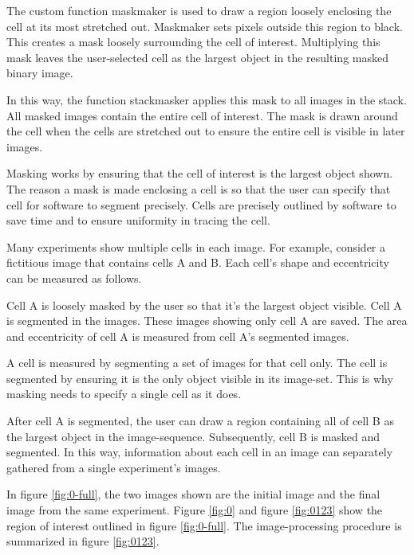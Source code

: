\documentclass[ twocolumn,notitlepage]{ revtex4-1}
\begin{document}
The custom function maskmaker is used to draw a region loosely enclosing the cell at its most stretched out. Maskmaker sets pixels outside this region to black. This creates a mask loosely surrounding the cell of interest. Multiplying this mask leaves the user-selected cell as the largest object in the resulting masked binary image.

In this way, the function stackmasker applies this mask to all images in the stack. All masked images contain the entire cell of interest. The mask is drawn around the cell when the cells are stretched out to ensure the entire cell is visible in later images.

Masking works by ensuring that the cell of interest is the largest object shown. The reason a mask is made enclosing a cell is so that the user can specify that cell for software to segment precisely. Cells are precisely outlined by software to save time and to ensure uniformity in tracing the cell.

Many experiments show multiple cells in each image. For example, consider a fictitious image that contains cells A and B. Each cell's shape and eccentricity can be measured as follows.

Cell A is loosely masked by the user so that it's the largest object visible. Cell A is segmented in the images. These images showing only cell A are saved. The area and eccentricity of cell A is measured from cell A's segmented images.

A cell is measured by segmenting a set of images for that cell only. The cell is segmented by ensuring it is the only object visible in its image-set. This is why masking needs to specify a single cell as it does.

After cell A is segmented, the user can draw a region containing all of cell B as the largest object in the image-sequence. Subsequently, cell B is masked and segmented. In this way, information about each cell in an image can separately gathered from a single experiment's images.

In figure \ref{fig:0-full}, the two images shown are the initial image and the final image from the same experiment. Figure \ref{fig:0} and figure \ref{fig:0123} show the region of interest outlined in figure \ref{fig:0-full}. The image-processing procedure is summarized in figure \ref{fig:0123}. 
\end{document}
